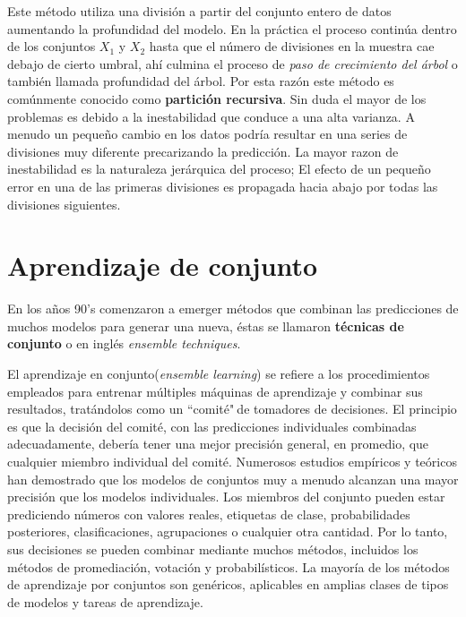     Este método utiliza una división a partir del conjunto entero de datos aumentando la profundidad del modelo. En la práctica el proceso continúa
    dentro de los conjuntos $X_1$ y $X_2$ hasta que el número de divisiones en la muestra cae debajo de cierto umbral, ahí culmina el proceso de
    \textit{paso de crecimiento del árbol}\cite{18} o también llamada profundidad del árbol.
    Por esta razón este método es comúnmente conocido como \textbf{partición recursiva}. Sin duda el mayor de los problemas es debido a la inestabilidad que conduce a una alta varianza. 
    A menudo un pequeño cambio en los datos podría resultar en una series de divisiones muy diferente precarizando la predicción. La mayor razon de inestabilidad es la naturaleza 
    jerárquica del proceso; El efecto de un pequeño error en una de las primeras divisiones es propagada hacia abajo por todas las divisiones siguientes\cite{13}.
%
%
%
%
\section{Aprendizaje de conjunto}
En los años 90's comenzaron a emerger métodos que combinan las predicciones de muchos modelos para generar una nueva, éstas se llamaron \textbf{técnicas de conjunto}
o en inglés \textit{ensemble techniques}\cite{18}.

El aprendizaje en conjunto(\textit{ensemble learning}) se refiere a los procedimientos empleados para entrenar múltiples máquinas de aprendizaje y combinar sus resultados, tratándolos como un ``comité"$~$de tomadores de decisiones. 
El principio es que la decisión del comité, con las predicciones individuales combinadas adecuadamente, debería tener una mejor precisión general, en promedio, que cualquier miembro individual del comité. 
Numerosos estudios empíricos y teóricos han demostrado que los modelos de conjuntos muy a menudo alcanzan una mayor precisión que los modelos individuales.
Los miembros del conjunto pueden estar prediciendo números con valores reales, etiquetas de clase, probabilidades posteriores, clasificaciones, agrupaciones o cualquier otra cantidad. Por lo tanto, 
sus decisiones se pueden combinar mediante muchos métodos, incluidos los métodos de promediación, votación y probabilísticos. La mayoría de los métodos de aprendizaje por conjuntos son genéricos, 
aplicables en amplias clases de tipos de modelos y tareas de aprendizaje\cite{6}.


